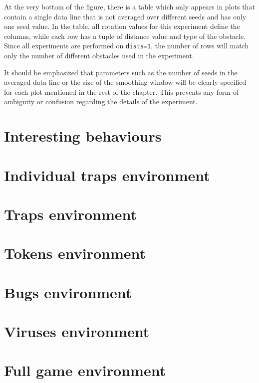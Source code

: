 At the very bottom of the figure, there is a table which only appears in plots that contain a single data line that is not averaged over different seeds and has only one seed value. In the table, all rotation values for this experiment define the columns, while each row has a tuple of distance value and type of the obstacle. Since all experiments are performed on \texttt{dists=1}, the number of rows will match only the number of different obstacles used in the experiment.

It should be emphasized that parameters such as the number of seeds in the averaged data line or the size of the smoothing window will be clearly specified for each plot mentioned in the rest of the chapter. This prevents any form of ambiguity or confusion regarding the details of the experiment.

\section{Interesting behaviours}
\section{Individual traps environment}
\section{Traps environment}
\section{Tokens environment}
\section{Bugs environment}
\section{Viruses environment}
\section{Full game environment}
